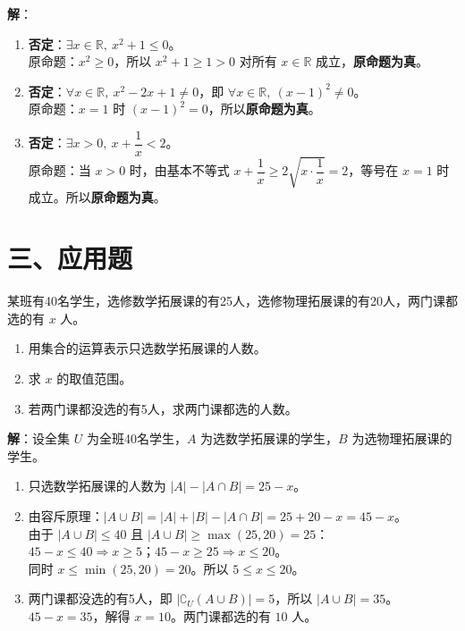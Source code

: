 \documentclass[12pt, a4paper]{ctexart}
\begin{document}
\textbf{解}：
\begin{enumerate}[label=(\arabic*)]
  \item \textbf{否定}：$\exists x \in \mathbb{R},\ x^2 + 1 \leq 0$。\\
    原命题：$x^2 \geq 0$，所以 $x^2 + 1 \geq 1 > 0$ 对所有 $x \in \mathbb{R}$ 成立，\textbf{原命题为真}。
  \item \textbf{否定}：$\forall x \in \mathbb{R},\ x^2 - 2x + 1 \neq 0$，即 $\forall x \in \mathbb{R},\ (x-1)^2 \neq 0$。\\
    原命题：$x = 1$ 时 $(x-1)^2 = 0$，所以\textbf{原命题为真}。
  \item \textbf{否定}：$\exists x > 0,\ x + \dfrac{1}{x} < 2$。\\
    原命题：当 $x > 0$ 时，由基本不等式 $x + \dfrac{1}{x} \geq 2\sqrt{x \cdot \dfrac{1}{x}} = 2$，等号在 $x = 1$ 时成立。所以\textbf{原命题为真}。
\end{enumerate}

\section*{\textcolor{apppurple}{三、应用题}}

\begin{appbox}[【应用1】学生选课统计]
某班有40名学生，选修数学拓展课的有25人，选修物理拓展课的有20人，两门课都选的有 $x$ 人。
\begin{enumerate}[label=(\arabic*)]
  \item 用集合的运算表示只选数学拓展课的人数。
  \item 求 $x$ 的取值范围。
  \item 若两门课都没选的有5人，求两门课都选的人数。
\end{enumerate}
\end{appbox}

\textbf{解}：设全集 $U$ 为全班40名学生，$A$ 为选数学拓展课的学生，$B$ 为选物理拓展课的学生。
\begin{enumerate}[label=(\arabic*)]
  \item 只选数学拓展课的人数为 $|A| - |A \cap B| = 25 - x$。
  \item 由容斥原理：$|A \cup B| = |A| + |B| - |A \cap B| = 25 + 20 - x = 45 - x$。\\
    由于 $|A \cup B| \leq 40$ 且 $|A \cup B| \geq \max(25, 20) = 25$：\\
    $45 - x \leq 40 \Rightarrow x \geq 5$；$45 - x \geq 25 \Rightarrow x \leq 20$。\\
    同时 $x \leq \min(25, 20) = 20$。所以 $5 \leq x \leq 20$。
  \item 两门课都没选的有5人，即 $|\complement_U(A \cup B)| = 5$，所以 $|A \cup B| = 35$。\\
    $45 - x = 35$，解得 $x = 10$。两门课都选的有 $\boxed{10}$ 人。
\end{enumerate}
\end{document}
